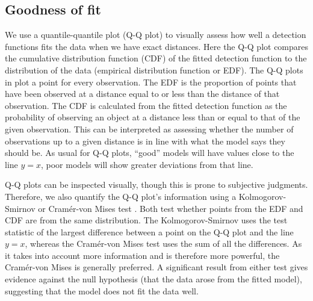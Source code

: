 \documentclass[article]{jss}
\begin{document}
\subsection{Goodness of fit}

We use a quantile-quantile plot (Q-Q plot) to visually assess how well a detection functions fits the data when we have exact distances. Here the Q-Q plot compares the cumulative distribution function (CDF) of the fitted detection function to the distribution of the data (empirical distribution function or EDF). The Q-Q plots in  plot a point for every observation. The EDF is the proportion of points that have been observed at a distance equal to or less than the distance of that observation. The CDF is calculated from the fitted detection function as the probability of observing an object at a distance less than or equal to that of the given observation. This can be interpreted as assessing whether the number of observations up to a given distance is in line with what the model says they should be. As usual for Q-Q plots, ``good'' models will have values close to the line $y=x$, poor models will show greater deviations from that line.

Q-Q plots can be inspected visually, though this is prone to subjective judgments. Therefore, we also quantify the Q-Q plot's information using a Kolmogorov-Smirnov or Cram\'{e}r-von Mises test \citep{Burnham:2004vd}. Both test whether points from the EDF and CDF are from the same distribution. The Kolmogorov-Smirnov uses the test statistic of the largest difference between a point on the Q-Q plot and the line $y=x$, whereas the Cram\'{e}r-von Mises test uses the sum of all the differences. As it takes into account more information and is therefore more powerful, the Cram\'{e}r-von Mises is generally preferred. A significant result from either test gives evidence against the null hypothesis (that the data arose from the fitted model), suggesting that the model does not fit the data well. 
\end{document}
